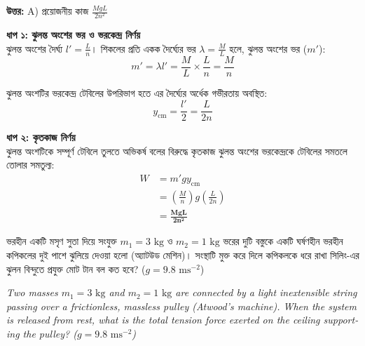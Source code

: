 \documentclass[12pt, a4paper]{article}
\begin{document}
\vspace{0.5em}
\begin{tcolorbox}[answerbox]
    \textbf{\color{success} উত্তর:} A) প্রয়োজনীয় কাজ $\frac{MgL}{2n^2}$
\end{tcolorbox}
\vspace{1em}

\begin{tcolorbox}[solutionbox={সমাধান (Solution)}]
    \noindent
    \textbf{ধাপ ১: ঝুলন্ত অংশের ভর ও ভরকেন্দ্র নির্ণয়} \\
    ঝুলন্ত অংশের দৈর্ঘ্য $l' = \frac{L}{n}$। শিকলের প্রতি একক দৈর্ঘ্যের ভর $\lambda = \frac{M}{L}$ হলে, ঝুলন্ত অংশের ভর ($m'$):
    \[ m' = \lambda l' = \frac{M}{L} \times \frac{L}{n} = \frac{M}{n} \]
    
    ঝুলন্ত অংশটির ভরকেন্দ্র টেবিলের উপরিভাগ হতে এর দৈর্ঘ্যের অর্ধেক গভীরতায় অবস্থিত:
    \[ y_{\text{cm}} = \frac{l'}{2} = \frac{L}{2n} \]
    
    \vspace{0.5em}
    \noindent\textbf{ধাপ ২: কৃতকাজ নির্ণয়} \\
    ঝুলন্ত অংশটিকে সম্পূর্ণ টেবিলে তুলতে অভিকর্ষ বলের বিরুদ্ধে কৃতকাজ ঝুলন্ত অংশের ভরকেন্দ্রকে টেবিলের সমতলে তোলার সমতুল্য:
    \begin{align*}
        W &= m' g y_{\text{cm}} \\
          &= \left(\frac{M}{n}\right) g \left(\frac{L}{2n}\right) \\
          &= \mathbf{\frac{MgL}{2n^2}}
    \end{align*}
\end{tcolorbox}
\newpage

\begin{tcolorbox}[questionbox={প্রশ্ন (Question) 9}]
    \noindent
    ভরহীন একটি মসৃণ সুতা দিয়ে সংযুক্ত $m_1 = 3\text{ kg}$ ও $m_2 = 1\text{ kg}$ ভরের দুটি বস্তুকে একটি ঘর্ষণহীন ভরহীন কপিকলের দুই পাশে ঝুলিয়ে দেওয়া হলো (অ্যাটউড মেশিন)। সংস্থাটি মুক্ত করে দিলে কপিকলকে ধরে রাখা সিলিং-এর ঝুলন বিন্দুতে প্রযুক্ত মোট টান বল কত হবে? ($g = 9.8\text{ ms}^{-2}$)
    
    \vspace{0.8em}
    \begin{english}
    \noindent\textit{\color{darkgray}
    Two masses $m_1 = 3\text{ kg}$ and $m_2 = 1\text{ kg}$ are connected by a light inextensible string passing over a frictionless, massless pulley (Atwood's machine). When the system is released from rest, what is the total tension force exerted on the ceiling supporting the pulley? ($g = 9.8\text{ ms}^{-2}$)
    }
    \end{english}
\end{tcolorbox}
\end{document}
